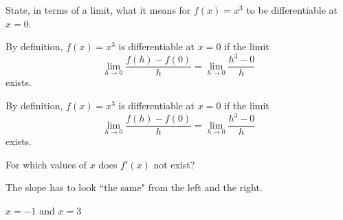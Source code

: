 \begin{question}[2006H]
State, in terms of a limit, what it means for
$f(x) = x^3$ to be differentiable at $x = 0$.
\end{question}
\begin{answer}
By definition, $f(x) = x^3$ is differentiable at $x = 0$
if the limit
$$
\lim_{h\rightarrow 0}\frac{f(h)-f(0)}{h}
=\lim_{h\rightarrow 0}\frac{h^3-0}{h}
$$
exists.
\end{answer}
\begin{solution}
By definition, $f(x) = x^3$ is differentiable at $x = 0$
if the limit
$$
\lim_{h\rightarrow 0}\frac{f(h)-f(0)}{h}
=\lim_{h\rightarrow 0}\frac{h^3-0}{h}
$$
exists.
\end{solution}



\begin{Mquestion}For which values of $x$ does $f'(x)$ not exist?
\begin{center}
\end{center}
\end{Mquestion}
\begin{hint} The slope has to look ``the same" from the left and the right.
\end{hint}
\begin{answer} $x=-1$ and $x=3$
\end{answer}
